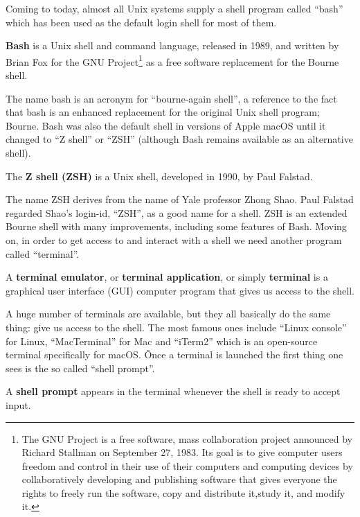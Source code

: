Coming to today, almost all Unix systems supply a shell program called ``bash'' which has been used as the default login
shell for most of them.

\bd[Bash]
\textbf{Bash} is a Unix shell and command language, released in 1989, and written by Brian Fox for the GNU
Project\footnote{The GNU Project is a free software, mass collaboration project announced by Richard Stallman on
September 27, 1983. Its goal is to give computer users freedom and control in their use of their computers and computing
devices by collaboratively developing and publishing software that gives everyone the rights to freely run the software,
copy and distribute it,study it, and modify it.} as a free software replacement for the Bourne shell.
\ed

The name bash is an acronym for ``bourne-again shell'', a reference to the fact that bash is an enhanced replacement
for the original Unix shell program; Bourne. Bash was also the default shell in versions of Apple macOS until it
changed to ``Z shell'' or ``ZSH'' (although Bash remains available as an alternative shell).

The \textbf{Z shell (ZSH)} is a Unix shell, developed in 1990, by Paul Falstad.
\ed

The name ZSH derives from the name of Yale professor Zhong Shao. Paul Falstad regarded Shao's login-id, ``ZSH'', as a
good name for a shell. ZSH is an extended Bourne shell with many improvements, including some features of Bash. \v

Moving on, in order to get access to and interact with a shell we need another program called ``terminal''.

A \textbf{terminal emulator}, or \textbf{terminal application}, or simply \textbf{terminal} is a graphical user
interface (GUI) computer program that gives us access to the shell.
\ed

A huge number of terminals are available, but they all basically do the same thing: give us access to the shell. The
most famous ones include ``Linux console'' for Linux, ``MacTerminal'' for Mac and ``iTerm2'' which is an open-source
terminal specifically for macOS. \v

Once a terminal is launched the first thing one sees is the so called ``shell prompt''.

A \textbf{shell prompt} appears in the terminal whenever the shell is ready to accept input.
\ed

